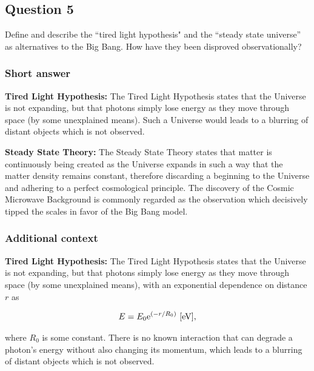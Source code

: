 \documentclass[a4paper,11pt]{article}
\begin{document}
%
%

\newpage
\subsection{Question 5}

Define and describe the ``tired light hypothesis" and the ``steady state universe'' as alternatives to the Big Bang. How have they been disproved observationally?

\subsubsection{Short answer}

{\noindent}\textbf{Tired Light Hypothesis:} The Tired Light Hypothesis states that the Universe is not expanding, but that photons simply lose energy as they move through space (by some unexplained means). Such a Universe would leads to a blurring of distant objects which is not observed.

{\noindent}\textbf{Steady State Theory:} The Steady State Theory states that matter is continuously being created as the Universe expands in such a way that the matter density remains constant, therefore discarding a beginning to the Universe and adhering to a perfect cosmological principle. The discovery of the Cosmic Microwave Background is commonly regarded as the observation which decisively tipped the scales in favor of the Big Bang model.

\subsubsection{Additional context}

{\noindent}\textbf{Tired Light Hypothesis:} The Tired Light Hypothesis states that the Universe is not expanding, but that photons simply lose energy as they move through space (by some unexplained means), with an exponential dependence on distance $r$ as

\begin{align*}
    E = E_0 \mathrm{e}^{(-r/R_0)} ~ [{\rm eV}],
\end{align*}

{\noindent}where $R_0$ is some constant. There is no known interaction that can degrade a photon's energy without also changing its momentum, which leads to a blurring of distant objects which is not observed.
\end{document}
